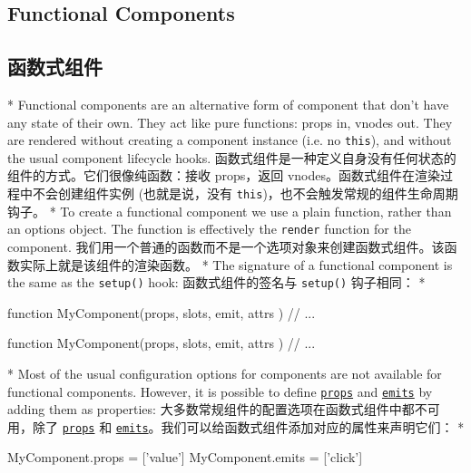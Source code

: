 \begin{paracol}{2}
\subsection{Functional Components}
\switchcolumn
\subsection{函数式组件}
\switchcolumn[0]*%
Functional components are an alternative form of component that don't
have any state of their own. They act like pure functions: props in,
vnodes out. They are rendered without creating a component instance
(i.e. no \texttt{this}), and without the usual component lifecycle
hooks.
\switchcolumn
函数式组件是一种定义自身没有任何状态的组件的方式。它们很像纯函数：接收
props，返回 vnodes。函数式组件在渲染过程中不会创建组件实例
(也就是说，没有 \texttt{this})，也不会触发常规的组件生命周期钩子。
\switchcolumn[0]*%
To create a functional component we use a plain function, rather than an
options object. The function is effectively the \texttt{render} function
for the component.
\switchcolumn
我们用一个普通的函数而不是一个选项对象来创建函数式组件。该函数实际上就是该组件的渲染函数。
\switchcolumn[0]*%
The signature of a functional component is the same as the
\texttt{setup()} hook:
\switchcolumn
函数式组件的签名与 \texttt{setup()} 钩子相同：
\switchcolumn[0]*%
\begin{codeJs}
function MyComponent(props, { slots, emit, attrs }) {
  // ...
}
\end{codeJs}
\switchcolumn
\begin{codeJs}
function MyComponent(props, { slots, emit, attrs }) {
  // ...
}
\end{codeJs}
\switchcolumn[0]*%
Most of the usual configuration options for components are not available
for functional components. However, it is possible to define
\href{https://vuejs.org/api/options-state.html\#props}{\texttt{props}}
and
\href{https://vuejs.org/api/options-state.html\#emits}{\texttt{emits}}
by adding them as properties:
\switchcolumn
大多数常规组件的配置选项在函数式组件中都不可用，除了
\href{https://cn.vuejs.org/api/options-state.html\#props}{\texttt{props}}
和
\href{https://cn.vuejs.org/api/options-state.html\#emits}{\texttt{emits}}。我们可以给函数式组件添加对应的属性来声明它们：
\switchcolumn[0]*%
\begin{codeJs}
MyComponent.props = ['value']
MyComponent.emits = ['click']
\end{codeJs}
\switchcolumn
\begin{codeJs}

\end{codeJs}
\end{paracol}
